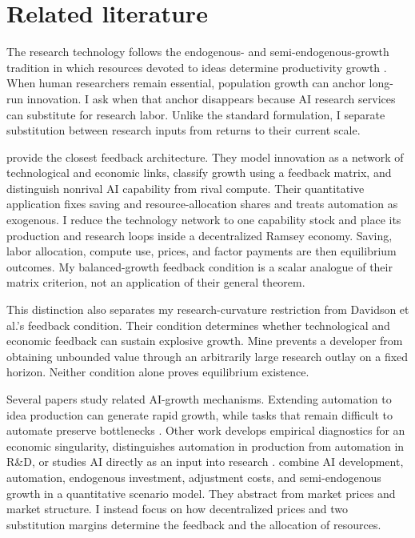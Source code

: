 \section{Related literature}

The research technology follows the endogenous- and semi-endogenous-growth
tradition in which resources devoted to ideas determine productivity growth
\citep{romer1990,aghionhowitt1992,jones1995}. When human researchers remain
essential, population growth can anchor long-run innovation. I ask when that
anchor disappears because AI research services can substitute for research labor. Unlike
the standard formulation, I separate substitution between research inputs from
returns to their current scale.

\citet{davidsonetal2026} provide the closest feedback architecture. They model
innovation as a network of technological and economic links, classify growth
using a feedback matrix, and distinguish nonrival AI capability from rival
compute. Their quantitative application fixes saving and resource-allocation
shares and treats automation as exogenous. I reduce the technology network to one
capability stock and place its production and research loops inside a
decentralized Ramsey economy. Saving, labor allocation, compute use, prices, and
factor payments are then equilibrium outcomes. My balanced-growth feedback
condition is a scalar analogue of their matrix criterion, not an application of
their general theorem.

This distinction also separates my research-curvature restriction from Davidson
et al.'s feedback condition. Their condition determines whether technological
and economic feedback can sustain explosive growth. Mine prevents a developer
from obtaining unbounded value through an arbitrarily large research outlay on a
fixed horizon. Neither condition alone proves equilibrium existence.

Several papers study related AI-growth mechanisms. Extending automation to idea
production can generate rapid growth, while tasks that remain difficult to
automate preserve bottlenecks \citep{aghionjonesjones2019}. Other work develops
empirical diagnostics for an economic singularity, distinguishes automation in
production from automation in R\&D, or studies AI directly as an input into
research \citep{nordhaus2021,trammellkorinek2023,jones2025rd}.
\citet{erdiletal2025gate} combine AI development, automation, endogenous
investment, adjustment costs, and semi-endogenous growth in a quantitative
scenario model. They abstract from market prices and market structure. I instead
focus on how decentralized prices and two substitution margins determine the
feedback and the allocation of resources.

